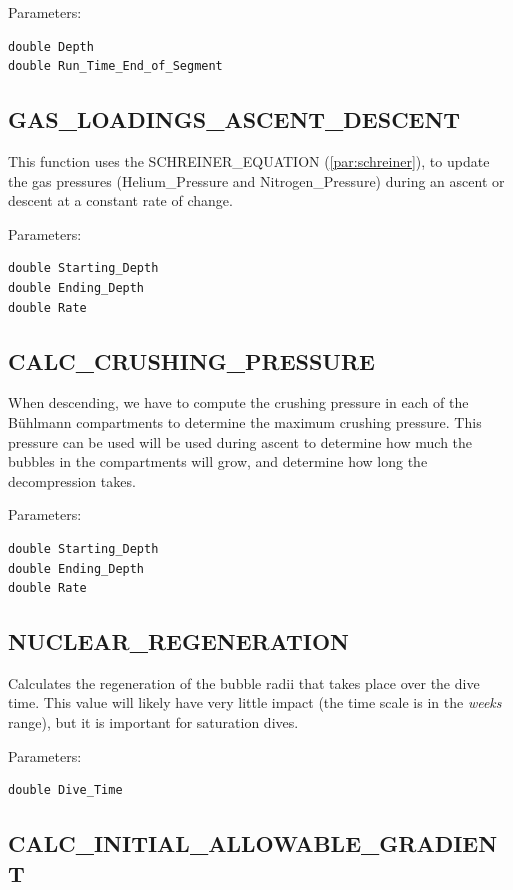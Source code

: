 \documentclass[12pt]{article}
\begin{document}
Parameters:
\begin{verbatim}
double Depth
double Run_Time_End_of_Segment
\end{verbatim}

\subsection{GAS\_LOADINGS\_ASCENT\_DESCENT}

This function uses the SCHREINER\_EQUATION (\ref{par:schreiner}), to update the
gas pressures (Helium\_Pressure and Nitrogen\_Pressure) during an ascent or descent
at a constant rate of change.

Parameters:
\begin{verbatim}
double Starting_Depth
double Ending_Depth
double Rate
\end{verbatim}

\subsection{CALC\_CRUSHING\_PRESSURE}

When descending, we have to compute the crushing pressure in each of the B\"uhlmann
compartments to determine the maximum crushing pressure. This pressure can be used
will be used during ascent to determine how much the bubbles in the compartments
will grow, and determine how long the decompression takes.

Parameters:
\begin{verbatim}
double Starting_Depth
double Ending_Depth
double Rate
\end{verbatim}

\subsection{NUCLEAR\_REGENERATION}

Calculates the regeneration of the bubble radii that takes place over the dive time.
This value will likely have very little impact (the time scale is in the \textit{weeks} range),
but it is important for saturation dives.

Parameters:
\begin{verbatim}
double Dive_Time
\end{verbatim}

\subsection{CALC\_INITIAL\_ALLOWABLE\_GRADIENT}
\end{document}
